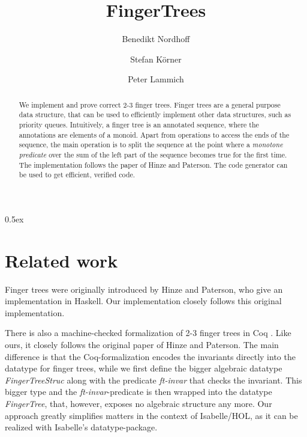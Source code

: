 \documentclass[11pt,a4paper]{article}
\begin{document}
\title{FingerTrees}
\author{Benedikt Nordhoff \and Stefan K\"orner \and Peter Lammich}


\maketitle

\begin{abstract}
  We implement and prove correct 2-3 finger trees.
  Finger trees are a general purpose data structure, that can be used to
  efficiently implement other data structures, such as priority queues.
  Intuitively, a finger tree is an annotated sequence, where the annotations are
  elements of a monoid. Apart from operations to access the ends of the sequence,
  the main operation is to split the sequence at the point where a 
  {\em monotone predicate} over the sum of the left part of the sequence 
  becomes true for the first time.
  The implementation follows the paper of Hinze and Paterson\cite{HiPa06}.
  The code generator can be used to get efficient, verified code.
\end{abstract}

\tableofcontents

\parindent 0pt\parskip 0.5ex




\section{Related work}
Finger trees were originally introduced by Hinze and Paterson\cite{HiPa06},
who give an implementation in Haskell. Our implementation closely follows
this original implementation.

There is also a machine-checked formalization of 2-3 finger trees in Coq \cite{So07}.
Like ours, it closely follows the original paper of Hinze and Paterson.
The main difference is that the Coq-formalization encodes the invariants directly into
the datatype for finger trees, while we first define the bigger algebraic datatype {\em FingerTreeStruc} 
along with the predicate {\em ft-invar} that checks the invariant. 
This bigger type and the {\em ft-invar}-predicate is then wrapped into the 
datatype {\em FingerTree}, that, however, exposes no algebraic structure any more. 
Our approach greatly simplifies matters in the context of Isabelle/HOL, as it can be 
realized with Isabelle's datatype-package.



\end{document}
